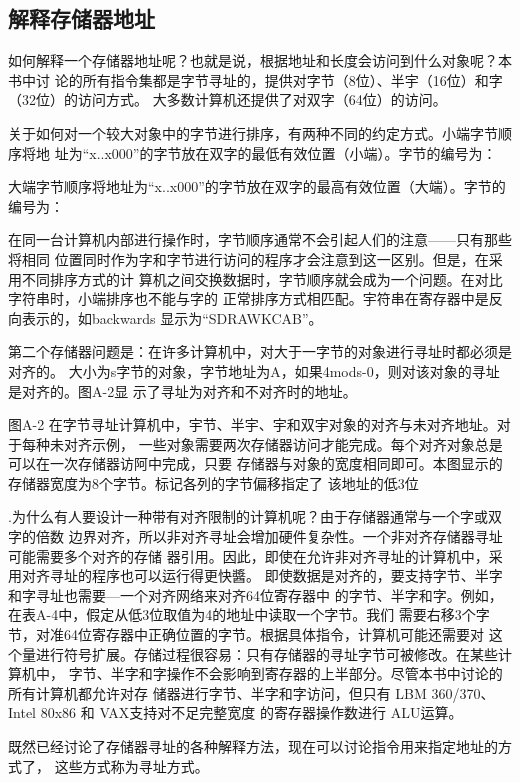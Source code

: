 \subsection{解释存储器地址}
如何解释一个存储器地址呢？也就是说，根据地址和长度会访问到什么对象呢？本书中讨
论的所有指令集都是字节寻址的，提供对字节（8位）、半宇（16位）和字（32位）的访问方式。
大多数计算机还提供了对双字（64位）的访问。

关于如何对一个较大对象中的字节进行排序，有两种不同的约定方式。小端字节顺序将地
址为“x..x000”的字节放在双字的最低有效位置（小端）。字节的编号为：

大端字节顺序将地址为“x..x000”的字节放在双字的最高有效位置（大端）。字节的编号为：

在同一台计算机内部进行操作时，字节顺序通常不会引起人们的注意——只有那些将相同
位置同时作为字和字节进行访问的程序才会注意到这一区别。但是，在采用不同排序方式的计
算机之间交换数据时，字节顺序就会成为一个问题。在对比字符串时，小端排序也不能与字的
正常排序方式相匹配。宇符串在寄存器中是反向表示的，如backwards 显示为“SDRAWKCAB”。

第二个存储器问题是：在许多计算机中，对大于一字节的对象进行寻址时都必须是对齐的。
大小为s字节的对象，字节地址为A，如果4mods-0，则对该对象的寻址是对齐的。图A-2显
示了寻址为对齐和不对齐时的地址。

图A-2 在字节寻址计算机中，宇节、半宇、宇和双宇对象的对齐与未对齐地址。对于每种未对齐示例，
一些对象需要两次存储器访问才能完成。每个对齐对象总是可以在一次存储器访阿中完成，只要
存储器与对象的宽度相同即可。本图显示的存储器宽度为8个字节。标记各列的字节偏移指定了
该地址的低3位

.为什么有人要设计一种带有对齐限制的计算机呢？由于存储器通常与一个字或双字的倍数
边界对齐，所以非对齐寻址会增加硬件复杂性。一个非对齐存储器寻址可能需要多个对齐的存储
器引用。因此，即使在允许非对齐寻址的计算机中，采用对齐寻址的程序也可以运行得更快醬。
即使数据是对齐的，要支持字节、半字和字寻址也需要—一个对齐网络来对齐64位寄存器中
的字节、半字和字。例如，在表A-4中，假定从低3位取值为4的地址中读取一个字节。我们
需要右移3个字节，对准64位寄存器中正确位置的字节。根据具体指令，计算机可能还需要对
这个量进行符号扩展。存储过程很容易：只有存储器的寻址字节可被修改。在某些计算机中，
字节、半字和字操作不会影响到寄存器的上半部分。尽管本书中讨论的所有计算机都允许对存
储器进行字节、半字和字访问，但只有 LBM 360/370、Intel 80x86 和 VAX支持对不足完整宽度
的寄存器操作数进行 ALU运算。

既然已经讨论了存储器寻址的各种解释方法，现在可以讨论指令用来指定地址的方式了，
这些方式称为寻址方式。

